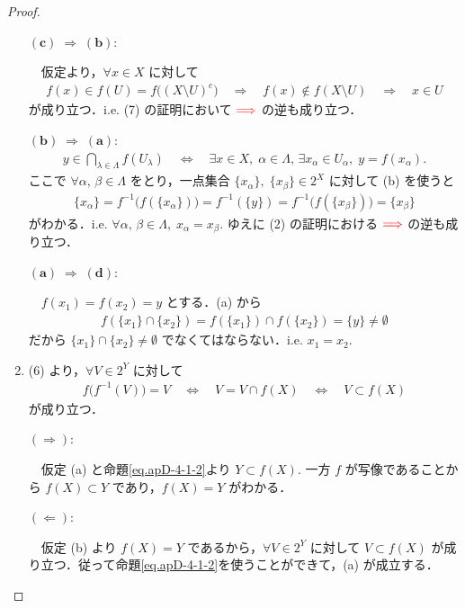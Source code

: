 \documentclass[geometry_main]{subfiles}
\begin{document}
\begin{proof}
\begin{enumerate}
        $\bm{(c) \; \Longrightarrow\; (b):}$ 
        
        　仮定より，$\forall x \in X$ に対して
        \begin{align}
            f(x) \in f(U) = f \bigl( (X \setminus U)^c \bigr) \quad \Longrightarrow \quad f(x) \notin f(X \setminus U) \quad \Longrightarrow \quad x \in U
        \end{align}
        が成り立つ．i.e. (7) の証明において $\textcolor{red}{\Longrightarrow}$ の逆も成り立つ．

        $\bm{(b) \; \Longrightarrow\; (a):}$
        \begin{align}
            y \in \bigcap_{\lambda \in \Lambda} f(U_\lambda) \quad \Longleftrightarrow \quad \exists x \in X,\; \alpha \in \Lambda,\, \exists x_\alpha \in U_\alpha,\; y = f(x_\alpha).
        \end{align}
        ここで $\forall \alpha,\, \beta \in \Lambda$ をとり，一点集合 $\{ x_\alpha \},\; \{ x_\beta \} \in 2^X$ に対して (b) を使うと
        \begin{align}
            \{ x_\alpha \} = f^{-1} \bigl( f(\{ x_\alpha \}) \bigr) = f^{-1}(\{ y \}) = f^{-1} \bigl( f(\{ x_\beta \}) \bigr) = \{ x_\beta \}
        \end{align}
        がわかる．i.e. $\forall \alpha,\, \beta \in \Lambda,\; x_\alpha = x_\beta.$ ゆえに (2) の証明における $\textcolor{red}{\Longrightarrow}$ の逆も成り立つ．

        $\bm{(a) \; \Longrightarrow\; (d):}$ 
        
        　$f(x_1) = f(x_2) = y$ とする．(a) から
        \begin{align}
            f(\{x_1\} \cap \{x_2\}) = f(\{x_1\}) \cap f(\{x_2\}) = \{y\} \neq \emptyset
        \end{align}
        だから $\{x_1\} \cap \{x_2\} \neq \emptyset$ でなくてはならない．i.e. $x_1 = x_2.$
        \item (6) より，$\forall V \in 2^Y$ に対して
        \begin{align}
            \label{eq.apD-4-1-2}
            f \bigl( f^{-1}(V) \bigr) = V \quad \Longleftrightarrow \quad V = V \cap f(X) \quad \Longleftrightarrow \quad V \subset f(X)
        \end{align}
        が成り立つ．
        
        $\bm{(\Longrightarrow):}$ 

        　仮定 (a) と命題\eqref{eq.apD-4-1-2}より $Y \subset f(X).$ 一方 $f$ が写像であることから $f(X) \subset Y$ であり，$f(X) = Y$ がわかる．
        
        $\bm{(\Longleftarrow):}$
        
        　仮定 (b) より $f(X) = Y$ であるから，$\forall V \in 2^Y$ に対して $V \subset f(X)$ が成り立つ．従って命題\eqref{eq.apD-4-1-2}を使うことができて，(a) が成立する．
    \end{enumerate}
\end{proof}
\end{document}
